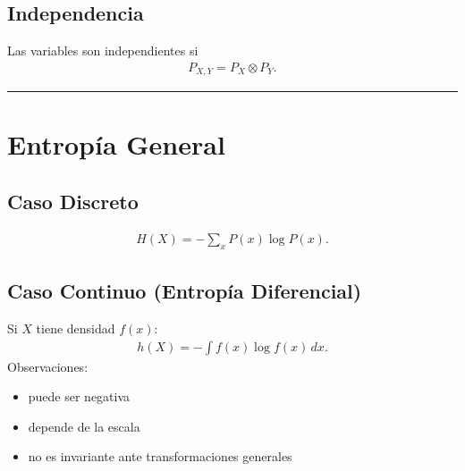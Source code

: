 \documentclass[letterpaper,10pt,english]{jupyterBook}
\begin{document}
\subsection{Independencia}
\label{\detokenize{02_mathematical_foundations/formal_definitions:independencia}}
\sphinxAtStartPar
Las variables son independientes si
\begin{equation*}
\begin{split}
P_{X,Y}=P_X\otimes P_Y.
\end{split}
\end{equation*}

\bigskip\hrule\bigskip



\section{Entropía General}
\label{\detokenize{02_mathematical_foundations/formal_definitions:entropia-general}}

\subsection{Caso Discreto}
\label{\detokenize{02_mathematical_foundations/formal_definitions:caso-discreto}}\begin{equation*}
\begin{split}
H(X)=-\sum_x P(x)\log P(x).
\end{split}
\end{equation*}

\subsection{Caso Continuo (Entropía Diferencial)}
\label{\detokenize{02_mathematical_foundations/formal_definitions:caso-continuo-entropia-diferencial}}
\sphinxAtStartPar
Si \(X\) tiene densidad \(f(x)\):
\begin{equation*}
\begin{split}
h(X)=-\int f(x)\log f(x)\,dx.
\end{split}
\end{equation*}
\sphinxAtStartPar
Observaciones:
\begin{itemize}
\item {} 
\sphinxAtStartPar
puede ser negativa

\item {} 
\sphinxAtStartPar
depende de la escala

\item {} 
\sphinxAtStartPar
no es invariante ante transformaciones generales

\end{itemize}
\end{document}
